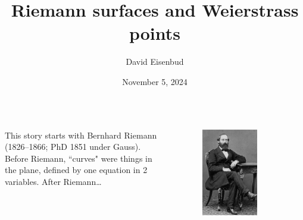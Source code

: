 \documentclass[12pt, aspectratio=169]{beamer}
\title{Riemann surfaces and Weierstrass points}
\author{David Eisenbud}
\date{November 5, 2024}
\begin{document}
\maketitle


\begin{frame}{}
\begin{columns}
 This story starts with \alert{Bernhard Riemann} (1826--1866; PhD 1851 under Gauss).
Before Riemann, ``curves" were things in the plane, defined by one equation in 2 variables. After Riemann\dots
{}
\begin{figure}
    \centering
    \includegraphics[width=0.7\textwidth]{"Bernhard-Riemann.jpg"}
\end{figure}
\end{columns}
 \end{frame}
\end{document}
